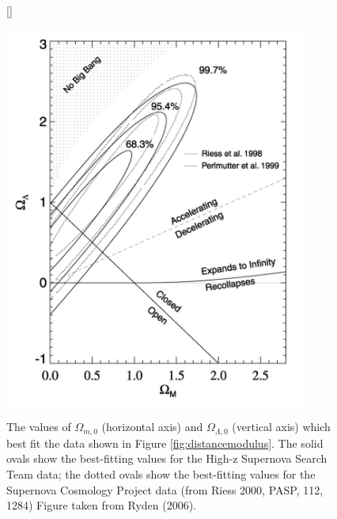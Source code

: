 \documentclass[a4paper,11pt]{article}
\begin{document}
\begin{figure}[h]
    [\FBwidth]
    {\caption{\footnotesize{The values of $\Omega_{m,0}$ (horizontal axis) and $\Omega_{\Lambda,0}$ (vertical axis) which best fit the data shown in Figure \ref{fig:distancemodulus}. The solid ovals show the best-fitting values for the High-z Supernova Search Team data; the dotted ovals show the best-fitting values for the Supernova Cosmology Project data (from Riess 2000, PASP, 112, 1284) Figure taken from Ryden (2006).}}
    \label{fig:omegamodel}}
    {\includegraphics[width=10cm]{figures/OmegaModel.png}}
\end{figure}
\end{document}
